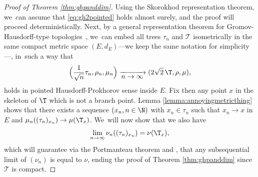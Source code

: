 \begin{proof}[Proof of Theorem \ref{thm:ghpanddim}]
Using the Skorokhod representation theorem, we~can assume that \eqref{eq:gh2pointed} holds almost surely, and the proof will proceed deterministically. Next, by a general representation theorem for Gromov-Hausdorff-type topologies~\cite[Lem.\,2.5]{khezeli2023unified}, we~can
embed all trees $\tau_n$ and $ \mathcal{T}$ isometrically in the same compact
metric space $(E,d_E)$---we keep the same notation for simplicity---, in~such a way that
\begin{equation*}
\Bigl(\frac{1}{\sqrt{n}} \tau_n,\rho_n,\mu_n\Bigr) \xrightarrow[\textstyle n\to\infty]{} (2\sqrt{2}\,\T,\rho,\mu),
\end{equation*}
holds in pointed Hausdorff-Prokhorov sense inside $E$. Fix then any point $x$ in the skeleton of $\T$ which is not a branch point. Lemma \ref{lemma:annoyingmetricthing} shows that there exists a sequence $(x_n,n\in\N)$ with $x_n\in\tau_n$ such that $x_n \to x$ in $E$ and $\mu_n((\tau_n)_{x_n}) \to \mu(\T_x)$. We~will now show that we also have
\begin{equation}\label{eq:GHPlimofnu} \lim_{n \to \infty} \nu_n((\tau_n)_{x_n})= \nu(\T_x),\end{equation}
which will guarantee via the Portmanteau theorem and \cite[Prop.\,1]{Steph13}, that any subsequential limit of $(\nu_n)$ is equal to $\nu$, ending the proof of Theorem \ref{thm:ghpanddim} since $ \mathcal{T}$ is compact.


\end{proof}
